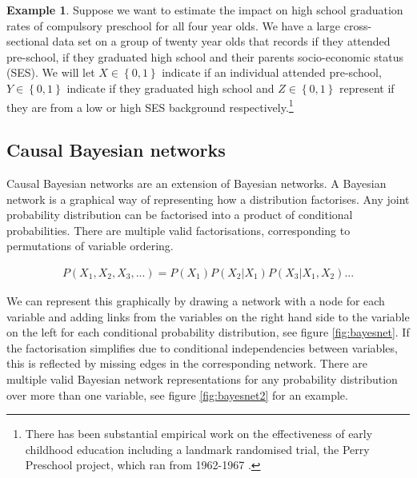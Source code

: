 \documentclass[11pt,a4paper,twoside]{report}
\newcommand{\set}[1]{\left\{#1\right\}}
\newcommand{\eqn}[1]{\begin{align}#1\end{align}}
\theoremstyle{plain}
\theoremstyle{definition}
\newtheorem{example}[theorem]{Example}
\begin{document}
\vspace*{.3cm}
\begin{example}
\label{exm:adjusting}
Suppose we want to estimate the impact on high school graduation rates of compulsory preschool for all four year olds. We have a large cross-sectional data set on a group of twenty year olds that records if they attended pre-school, if they graduated high school and their parents socio-economic status (SES). We will let $X\in \set{0,1}$ indicate if an individual attended pre-school, $Y \in \set{0,1}$ indicate if they graduated high school and $Z \in \set{0,1}$ represent if they are from a low or high SES background respectively.\footnote{There has been substantial empirical work on the effectiveness of early childhood education including a landmark randomised trial, the Perry Preschool project, which ran from 1962-1967 \citep{weikart1970longitudinal}.}
\end{example}


\subsection{Causal Bayesian networks}

Causal Bayesian networks are an extension of Bayesian networks. A Bayesian network is a graphical way of representing how a distribution factorises. Any joint probability distribution can be factorised into a product of conditional probabilities. There are multiple valid factorisations, corresponding to permutations of variable ordering.

\eqn{
\label{eqn:cbn:joint_dist}
P(X_{1},X_{2},X_{3},...)=P(X_{1})P(X_{2}|X_{1})P(X_{3}|X_{1},X_{2})...
}

We can represent this graphically by drawing a network with a node for each variable and adding links from the variables on the right hand side to the variable on the left for each conditional probability distribution, see figure \ref{fig:bayesnet}. If the factorisation simplifies due to conditional independencies between variables, this is reflected by missing edges in the corresponding network. There are multiple valid Bayesian network representations for any probability distribution over more than one variable, see figure \ref{fig:bayesnet2} for an example. 
\end{document}
